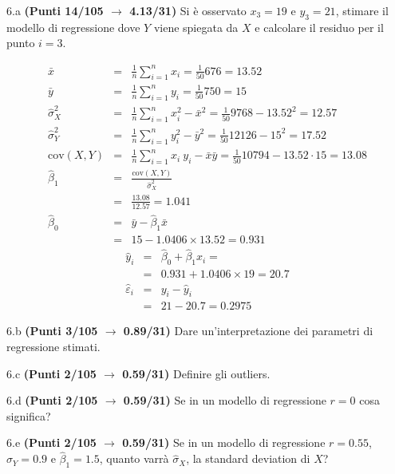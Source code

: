 \documentclass[
  11pt,
]{book}
\theoremstyle{mytheoremstyle}
\theoremstyle{mydefstyle}
\newenvironment{sol}
  {
  \begin{tcolorbox}[enhanced,breakable,arc=0.1mm,boxrule=1pt,colback=white,colframe=iblue,
  title=\bf \fontfamily{lmss}\selectfont \hspace{.5 cm} Soluzione,drop fuzzy shadow]

}{
\end{tcolorbox}
  }
\begin{document}
6.a \textbf{(Punti 14/105 \(\rightarrow\) 4.13/31)} Si è osservato \(x_3=19\) e \(y_3=21\), stimare il modello di regressione dove \(Y\) viene spiegata da \(X\) e calcolare il residuo per il punto \(i=3\).

\begin{sol}
\begin{eqnarray*}
           \bar x &=&\frac 1 n\sum_{i=1}^n x_i = \frac {1}{ 50 }  676 =  13.52 \\
           \bar y &=&\frac 1 n\sum_{i=1}^n y_i = \frac {1}{ 50 }  750 =  15 \\
           \hat\sigma_X^2&=&\frac 1 n\sum_{i=1}^n x_i^2-\bar x^2=\frac {1}{ 50 }  9768  - 13.52 ^2= 12.57 \\
           \hat\sigma_Y^2&=&\frac 1 n\sum_{i=1}^n y_i^2-\bar y^2=\frac {1}{ 50 }  12126  - 15 ^2= 17.52 \\
           \text{cov}(X,Y)&=&\frac 1 n\sum_{i=1}^n x_i~y_i-\bar x\bar y=\frac {1}{ 50 }  10794 - 13.52 \cdot 15 = 13.08 \\
           \hat\beta_1 &=& \frac{\text{cov}(X,Y)}{\hat\sigma_X^2} \\
                    &=& \frac{ 13.08 }{ 12.57 }  =  1.041 \\
           \hat\beta_0 &=& \bar y - \hat\beta_1 \bar x\\
                    &=&  15 - 1.0406 \times  13.52 = 0.931 
         \end{eqnarray*}\begin{eqnarray*}
\hat y_i &=&\hat\beta_0+\hat\beta_1 x_i=\\ 
&=& 0.931 + 1.0406 \times 19 = 20.7 \\ 
\hat \varepsilon_i &=& y_i-\hat y_i\\ 
&=& 21 - 20.7 = 0.2975  
\end{eqnarray*}

\end{sol}

6.b \textbf{(Punti 3/105 \(\rightarrow\) 0.89/31)} Dare un'interpretazione dei parametri di regressione stimati.

6.c \textbf{(Punti 2/105 \(\rightarrow\) 0.59/31)} Definire gli outliers.

6.d \textbf{(Punti 2/105 \(\rightarrow\) 0.59/31)} Se in un modello di regressione \(r=0\) cosa significa?

6.e \textbf{(Punti 2/105 \(\rightarrow\) 0.59/31)} Se in un modello di regressione \(r=0.55\), \(\hat\sigma_Y=0.9\) e \(\hat\beta_1=1.5\), quanto varrà
\(\hat\sigma_X\), la standard deviation di \(X\)?
\end{document}
